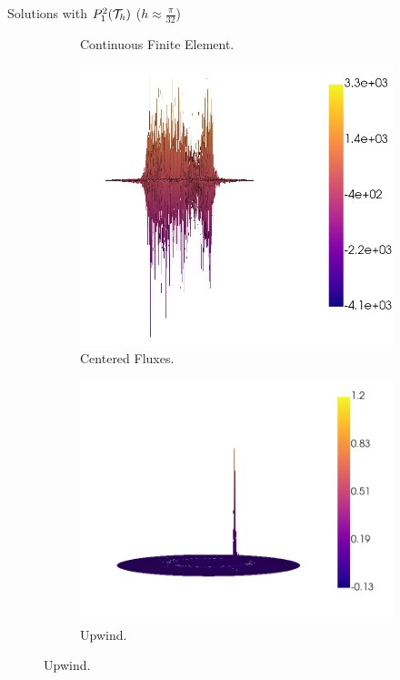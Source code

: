 \begin{frame}{Solutions with $\relax{P}_1^2(\mathcal{T}_h)$ ($h\approx\frac{\pi}{32}$)}
\begin{figure}[h!]
\begin{subfigure}[b]{0.49\textwidth}
						\caption{Continuous Finite Element.}
					\end{subfigure}
					\begin{subfigure}[b]{0.49\textwidth}
						\centering
						\includegraphics[scale=0.16]{img/Conveccion_Reaccion/strong/conv_react_u_CF_nx-64.png}
						\caption{Centered Fluxes.}
					\end{subfigure}
					\begin{subfigure}[b]{0.49\textwidth}
						\centering
						\includegraphics[scale=0.16]{img/Conveccion_Reaccion/strong/conv_react_u_UPW_nx-64.png}
						\caption{Upwind.}
					\end{subfigure}
				\end{figure}
			\end{frame}
